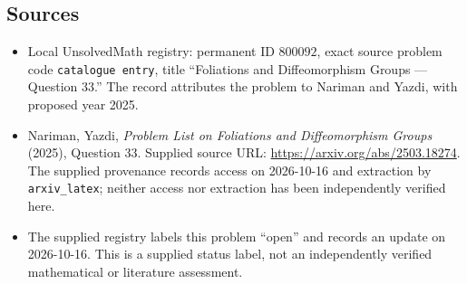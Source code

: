 \documentclass[11pt]{article}
\begin{document}
\subsection{Sources}
\begin{itemize}
\item Local UnsolvedMath registry: permanent ID \(800092\), exact source problem code \texttt{catalogue entry}, title ``Foliations and Diffeomorphism Groups --- Question 33.'' The record attributes the problem to Nariman and Yazdi, with proposed year 2025.
\item Nariman, Yazdi, \emph{Problem List on Foliations and Diffeomorphism Groups} (2025), Question 33. Supplied source URL: \url{https://arxiv.org/abs/2503.18274}. The supplied provenance records access on 2026-10-16 and extraction by \texttt{arxiv\_latex}; neither access nor extraction has been independently verified here.
\item The supplied registry labels this problem ``open'' and records an update on 2026-10-16. This is a supplied status label, not an independently verified mathematical or literature assessment.
\end{itemize}
\end{document}
